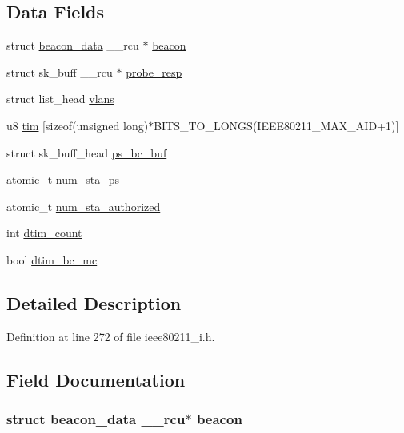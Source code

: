 \subsection*{Data Fields}
\begin{DoxyCompactItemize}
\item 
struct \hyperlink{structbeacon__data}{beacon\-\_\-data} \-\_\-\-\_\-rcu $\ast$ \hyperlink{structieee80211__if__ap_af423343a66559cac968f55f903c1cf3b}{beacon}
\item 
struct sk\-\_\-buff \-\_\-\-\_\-rcu $\ast$ \hyperlink{structieee80211__if__ap_ab6e788ecb6d5a607e56fcd97d0996d69}{probe\-\_\-resp}
\item 
struct list\-\_\-head \hyperlink{structieee80211__if__ap_ad647c724f4509c4bb97a527552b6497a}{vlans}
\item 
u8 \hyperlink{structieee80211__if__ap_ac8921d232cd7bc324ccfe9d22525d030}{tim} \mbox{[}sizeof(unsigned long)$\ast$B\-I\-T\-S\-\_\-\-T\-O\-\_\-\-L\-O\-N\-G\-S(I\-E\-E\-E80211\-\_\-\-M\-A\-X\-\_\-\-A\-I\-D+1)\mbox{]}
\item 
struct sk\-\_\-buff\-\_\-head \hyperlink{structieee80211__if__ap_ae1cfc557eb8683f9cb993a0e3c0003bb}{ps\-\_\-bc\-\_\-buf}
\item 
atomic\-\_\-t \hyperlink{structieee80211__if__ap_a5c58afde586c58d4b830915b47015999}{num\-\_\-sta\-\_\-ps}
\item 
atomic\-\_\-t \hyperlink{structieee80211__if__ap_a129987b49661f0799553c40659a8e807}{num\-\_\-sta\-\_\-authorized}
\item 
int \hyperlink{structieee80211__if__ap_abcc08bb90309210ff5688fff800cd7f1}{dtim\-\_\-count}
\item 
bool \hyperlink{structieee80211__if__ap_a7c2f6d7ac8d776b7b6238ab915f3b0f6}{dtim\-\_\-bc\-\_\-mc}
\end{DoxyCompactItemize}


\subsection{Detailed Description}


Definition at line 272 of file ieee80211\-\_\-i.\-h.



\subsection{Field Documentation}
\hypertarget{structieee80211__if__ap_af423343a66559cac968f55f903c1cf3b}{
\subsubsection[{beacon}]{\setlength{\rightskip}{0pt plus 5cm}struct {\bf beacon\-\_\-data} \-\_\-\-\_\-rcu$\ast$ beacon}}\label{structieee80211__if__ap_af423343a66559cac968f55f903c1cf3b}


